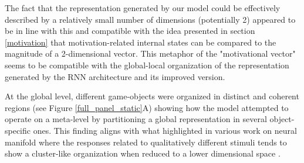 The fact that the representation generated by our model could be effectively described by a relatively small number of dimensions (potentially 2) appeared to be in line with this and compatible with the idea presented in section \ref{motivation} that motivation-related internal states can be compared to the magnitude of a 2-dimensional vector. This metaphor of the "motivational vector" seems to be compatible with the global-local organization of the representation generated by the RNN architecture and its improved version. 

At the global level, different game-objects were organized in distinct and coherent regions (see Figure \ref{full_panel_static}A) showing how the model attempted to operate on a meta-level by partitioning a global representation in several object-specific ones. This finding aligns with what highlighted in various work on neural manifold where the responses related to qualitatively different stimuli tends to show a cluster-like organization when reduced to a lower dimensional space \cite{stopfer2003intensity, gallego2017neural, ganmor2015thesaurus}. 

